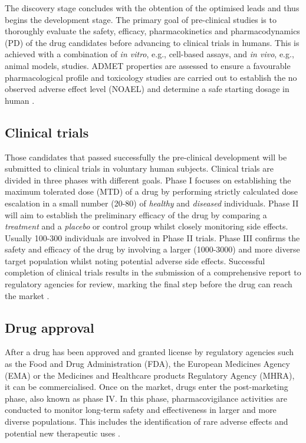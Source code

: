 The discovery stage concludes with the obtention of the optimised leads and thus begins the development stage. The primary goal of pre-clinical studies is to thoroughly evaluate the safety, efficacy, pharmacokinetics and pharmacodynamics (PD) of the drug candidates before advancing to clinical trials in humans. This is achieved with a combination of \textit{in vitro}, e.g., cell-based assays, and \textit{in vivo}, e.g., animal models, studies. ADMET properties are assessed to ensure a favourable pharmacological profile and toxicology studies are carried out to establish the no observed adverse effect level (NOAEL) and determine a safe starting dosage in human \cite{SHEGOKAR_2020_PRECLINICAL}.

\subsection{Clinical trials}

Those candidates that passed successfully the pre-clinical development will be submitted to clinical trials in voluntary human subjects. Clinical trials are divided in three phases with different goals. Phase I focuses on establishing the maximum tolerated dose (MTD) of a drug by performing strictly calculated dose escalation in a small number (20-80) of \textit{healthy} and \textit{diseased} individuals. Phase II will aim to establish the preliminary efficacy of the drug by comparing a \textit{treatment} and a \textit{placebo} or control group whilst closely monitoring side effects. Usually 100-300 individuals are involved in Phase II trials. Phase III confirms the safety and efficacy of the drug by involving a larger (1000-3000) and more diverse target population whilst noting potential adverse side effects. Successful completion of clinical trials results in the submission of a comprehensive report to regulatory agencies for review, marking the final step before the drug can reach the market \cite{UMSCHEID_2011_TRIALS}.

\subsection{Drug approval}

After a drug has been approved and granted license by regulatory agencies such as the Food and Drug Administration (FDA), the European Medicines Agency (EMA) or the Medicines and Healthcare products Regulatory Agency (MHRA), it can be commercialised. Once on the market, drugs enter the post-marketing phase, also known as phase IV. In this phase, pharmacovigilance activities are conducted to monitor long-term safety and effectiveness in larger and more diverse populations. This includes the identification of rare adverse effects and potential new therapeutic uses \cite{SUVARNA_2010_PHASE4}.

